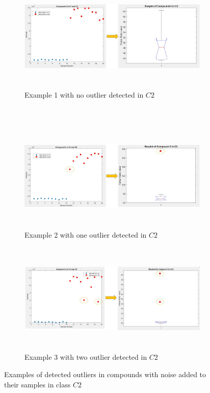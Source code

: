 \begin{figure}[t!]
	\centering
	\begin{subfigure}{1\textwidth}
		\centering
		\includegraphics[height=2.1in]{no_outlier}
		\caption{Example 1 with no outlier detected in $C2$}
		\label{fisher1}
	\end{subfigure}%
	 \\
	\begin{subfigure}{1\textwidth}
		\centering
		\includegraphics[height=2.1in]{one_outlier}
		\caption{Example 2 with one outlier detected in $C2$}
		\label{fisher2}
	\end{subfigure}

	\begin{subfigure}{1\textwidth}
		\centering
		\includegraphics[height=2.1in]{two_outlier}
		\caption{Example 3 with two outlier detected in $C2$}
		\label{fisher3}
	\end{subfigure}
	\caption{Examples of detected outliers in compounds with noise added to their samples in class $C2$}
	\label{fish}
\end{figure}
